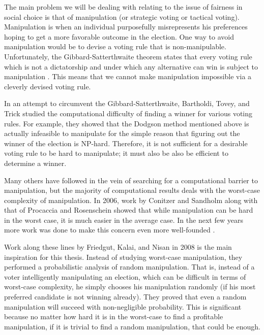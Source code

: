 	The main problem we will be dealing with relating to the issue of fairness in social choice is that of manipulation (or strategic voting or tactical voting). Manipulation is when an individual purposefully misrepresents his preferences hoping to get a more favorable outcome in the election. One way to avoid manipulation would be to devise a voting rule that is non-manipulable. Unfortunately, the Gibbard-Satterthwaite theorem states that every voting rule which is not a dictatorship and under which any alternative can win is subject to manipulation \cite{gibbard1973manipulation, satterthwaite1975strategy, duggan2000strategic}. This means that we cannot make manipulation impossible via a cleverly devised voting rule.

	In an attempt to circumvent the Gibbard-Satterthwaite, Bartholdi, Tovey, and Trick studied the computational difficulty of finding a winner for various voting rules. For example, they showed that the Dodgson method mentioned above \cite{dodgson1876method} is actually infeasible to manipulate for the simple reason that figuring out the winner of the election is NP-hard. Therefore, it is not sufficient for a desirable voting rule to be hard to manipulate; it must also be also be efficient to determine a winner.

	Many others have followed in the vein of searching for a computational barrier to manipulation, but the majority of computational results deals with the worst-case complexity of manipulation. In 2006, work by Conitzer and Sandholm \cite{conitzer2006nonexistence} along with that of Procaccia and Rosenschein \cite{procaccia2006junta} showed that while manipulation can be hard in the worst case, it is much easier in the average case. In the next few years more work was done to make this concern even more well-founded \cite{procaccia2007average, erdelyi2007approximating}.

	Work along these lines by Friedgut, Kalai, and Nisan \cite{friedgut2008elections} in 2008 is the main inspiration for this thesis. Instead of studying worst-case manipulation, they performed a probabilistic analysis of random manipulation. That is, instead of a voter intelligently manipulating an election, which can be difficult in terms of worst-case complexity, he simply chooses his manipulation randomly (if his most preferred candidate is not winning already). They proved that even a random manipulation will succeed with non-negligible probability. This is significant because no matter how hard it is in the worst-case to find a profitable manipulation, if it is trivial to find a random manipulation, that could be enough.

